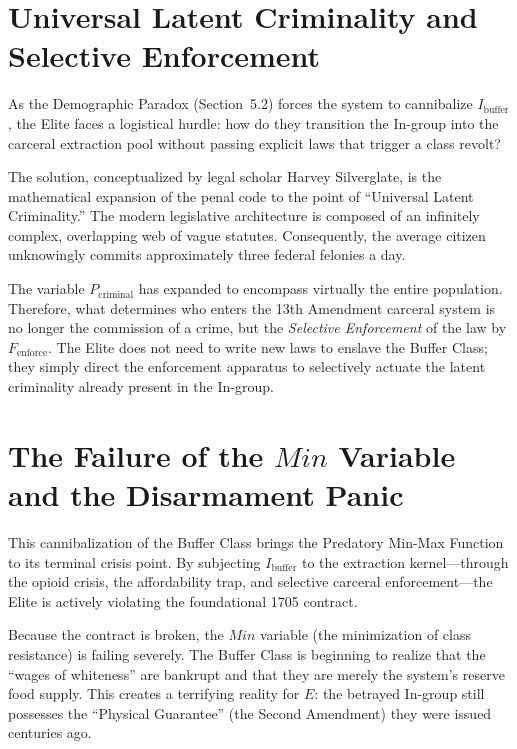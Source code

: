 \documentclass[12pt,openany]{book}
\begin{document}
\section{Universal Latent Criminality and Selective Enforcement}

As the Demographic Paradox (Section~5.2) forces the system to cannibalize $I_{\text{buffer}}$, the Elite faces a logistical hurdle: how do they transition the In-group into the carceral extraction pool without passing explicit laws that trigger a class revolt?

The solution, conceptualized by legal scholar Harvey Silverglate, is the mathematical expansion of the penal code to the point of ``Universal Latent Criminality.'' The modern legislative architecture is composed of an infinitely complex, overlapping web of vague statutes. Consequently, the average citizen unknowingly commits approximately three federal felonies a day.

The variable $P_{\text{criminal}}$ has expanded to encompass virtually the entire population. Therefore, what determines who enters the 13th Amendment carceral system is no longer the commission of a crime, but the \textit{Selective Enforcement} of the law by $F_{\text{enforce}}$. The Elite does not need to write new laws to enslave the Buffer Class; they simply direct the enforcement apparatus to selectively actuate the latent criminality already present in the In-group.

\section{The Failure of the \texorpdfstring{$Min$}{Min} Variable and the Disarmament Panic}

This cannibalization of the Buffer Class brings the Predatory Min-Max Function to its terminal crisis point. By subjecting $I_{\text{buffer}}$ to the extraction kernel---through the opioid crisis, the affordability trap, and selective carceral enforcement---the Elite is actively violating the foundational 1705 contract.

Because the contract is broken, the $Min$ variable (the minimization of class resistance) is failing severely. The Buffer Class is beginning to realize that the ``wages of whiteness'' are bankrupt and that they are merely the system's reserve food supply. This creates a terrifying reality for $E$: the betrayed In-group still possesses the ``Physical Guarantee'' (the Second Amendment) they were issued centuries ago.
\end{document}

